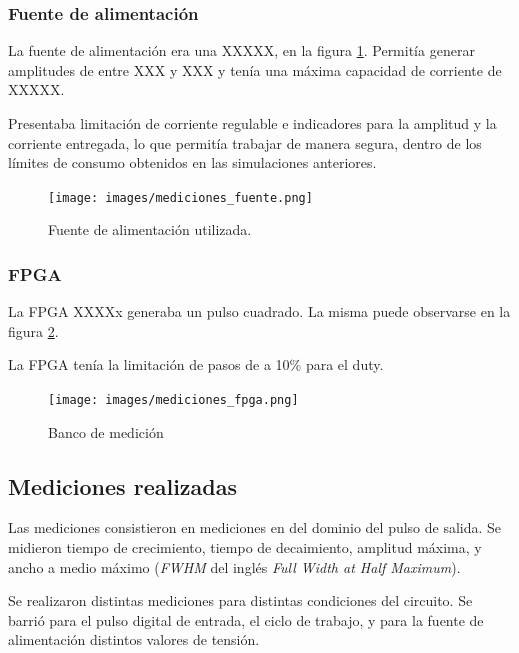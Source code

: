 \subsubsection{Fuente de alimentación}

La fuente de alimentación era una XXXXX, en la figura \ref{fig:mediciones_fuente}. Permitía generar amplitudes de entre
XXX y XXX y tenía una máxima capacidad de corriente de XXXXX.

Presentaba limitación de corriente regulable e indicadores para la amplitud y la
corriente entregada, lo que permitía trabajar de manera segura, dentro de los
límites de consumo obtenidos en las simulaciones anteriores.

\begin{figure}
  \centering
    \texttt{[image: images/mediciones\_fuente.png]}
    \caption{Fuente de alimentación utilizada.}
    \label{fig:mediciones_fuente}
\end{figure}


\subsubsection{FPGA}

La FPGA XXXXx generaba un pulso cuadrado. La misma puede observarse en la figura
\ref{fig:mediciones_fpga}.

La FPGA tenía la limitación de pasos de a 10\% para el duty.

\begin{figure}
  \centering
    \texttt{[image: images/mediciones\_fpga.png]}
    \caption{Banco de medición}
    \label{fig:mediciones_fpga}
\end{figure}


\subsection{Mediciones realizadas}

Las mediciones consistieron en mediciones en del dominio del pulso de salida. Se
midieron tiempo de crecimiento, tiempo de decaimiento, amplitud máxima, y ancho
a medio máximo (\textit{FWHM} del inglés \textit{Full Width at Half Maximum}).

Se realizaron distintas mediciones para distintas condiciones del circuito. Se
barrió para el pulso digital de entrada, el ciclo de trabajo, y para la fuente
de alimentación distintos valores de tensión.

